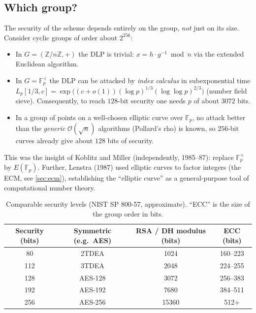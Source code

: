 \documentclass[11pt,a4paper,oneside]{book}
\theoremstyle{plain}
\theoremstyle{definition}
\theoremstyle{remark}
\newcommand{\Z}{\mathbb{Z}}
\newcommand{\F}{\mathbb{F}}
\newcommand{\bigO}{\mathcal{O}}
\begin{document}
\subsection{Which group?}

The security of the scheme depends entirely on the group, \emph{not} just on its size. Consider cyclic groups of order about $2^{256}$:
\begin{itemize}
\item In $G=(\Z/n\Z,+)$ the DLP is trivial: $x=h\cdot g^{-1} \bmod n$ via the extended Euclidean algorithm.
\item In $G=\F_p^\times$ the DLP can be attacked by \emph{index calculus} in subexponential time
$L_p[1/3,c]=\exp\big((c+o(1))(\log p)^{1/3}(\log\log p)^{2/3}\big)$ (number field sieve). Consequently, to reach $128$-bit security one needs $p$ of about $3072$ bits.
\item In a group of points on a well-chosen elliptic curve over $\F_p$, no attack better than the \emph{generic} $\bigO(\sqrt{n})$ algorithms (Pollard's rho) is known, so $256$-bit
curves already give about $128$ bits of security.
\end{itemize}

This was the insight of Koblitz and Miller (independently, 1985--87): replace $\F_p^\times$ by $E(\F_p)$.
Further, Lenstra (1987) used elliptic curves to factor integers (the ECM, see \cref{sec:ecm}), establishing the ``elliptic curve'' as a general-purpose tool of computational number theory.

\begin{table}[ht]
\centering
\caption{Comparable security levels (NIST SP 800-57, approximate). ``ECC'' is the size of the group order in bits.}
\label{tab:keysizes}
\begin{tabular}{@{}cccc@{}}
\toprule
Security (bits) & Symmetric (e.g.\ AES) & RSA / DH modulus (bits) & ECC (bits) \\
\midrule
80  & 2TDEA & 1024 & 160--223\\
112 & 3TDEA & 2048 & 224--255\\
128 & AES-128 & 3072 & 256--383\\
192 & AES-192 & 7680 & 384--511\\
256 & AES-256 & 15360 & 512+\\
\bottomrule
\end{tabular}
\end{table}
\end{document}

